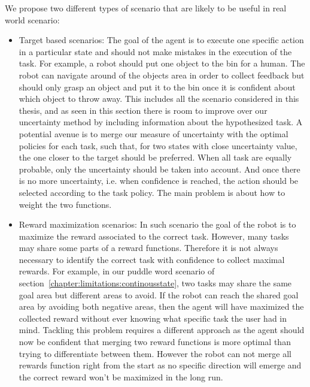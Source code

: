 We propose two different types of scenario that are likely to be useful in real world scenario: 
\begin{itemize}
\item Target based scenarios: The goal of the agent is to execute one specific action in a particular state and should not make mistakes in the execution of the task. For example, a robot should put one object to the bin for a human. The robot can navigate around of the objects area in order to collect feedback but should only grasp an object and put it to the bin once it is confident about which object to throw away. This includes all the scenario considered in this thesis, and as seen in this section there is room to improve over our uncertainty method by including information about the hypothesized task. A potential avenue is to merge our measure of uncertainty with the optimal policies for each task, such that, for two states with close uncertainty value, the one closer to the target should be preferred. When all task are equally probable, only the uncertainty should be taken into account. And once there is no more uncertainty, i.e. when confidence is reached, the action should be selected according to the task policy. The main problem is about how to weight the two functions.

\item Reward maximization scenarios: In such scenario the goal of the robot is to maximize the reward associated to the correct task. However, many tasks may share some parts of a reward functions. Therefore it is not always necessary to identify the correct task with confidence to collect maximal rewards. For example, in our puddle word scenario of section~\ref{chapter:limitations:continousstate}, two tasks may share the same goal area but different areas to avoid. If the robot can reach the shared goal area by avoiding both negative areas, then the agent will have maximized the collected reward without ever knowing what specific task the user had in mind. Tackling this problem requires a different approach as the agent should now be confident that merging two reward functions is more optimal than trying to differentiate between them. However the robot can not merge all rewards function right from the start as no specific direction will emerge and the correct reward won't be maximized in the long run.
\end{itemize}